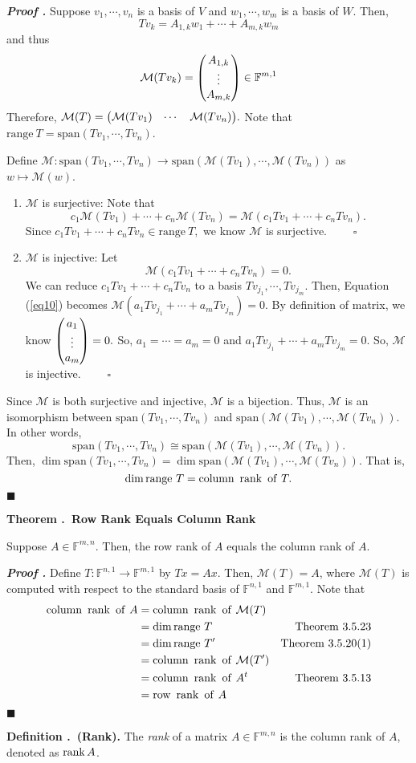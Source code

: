 \documentclass[11pt, letterpaper]{article}
\newcounter{index}[subsection]
\newenvironment*{df}[1]{\par\noindent\textbf{Definition \thesubsection.\stepcounter{index}\theindex\ (#1).}}{\par}
\newenvironment*{thm}[1]{\begin{tcolorbox}\par\noindent\textbf{Theorem \thesubsection.\stepcounter{index}\theindex\ #1} \par}{\par\end{tcolorbox}}
\newcounter{nprf}[subsection]
\newenvironment*{prf}{\par\indent\textbf{\textit{Proof \stepcounter{nprf}\thenprf.}}}{\hfill$\blacksquare$\par}
\def\F{\mathbb{F}}
\def\M{\mathcal{M}}
\def\span{\mathrm{span}}
\def\pqde{\qquad\square}
\def\range{\mathrm{range\ }}
\begin{document}
\begin{prf}
	Suppose $v_1,\cdots,v_n$ is a basis of $V$ and $w_1,\cdots,w_m$ is a basis of $W$. Then, \[Tv_k=A_{1,k}w_1+\cdots+A_{m,k}w_m\] and thus \[\M(Tv_k)=\mqty(A_{1,k}\\\vdots\\A_{m,k})\in\F^{m,1}\] Therefore, $\M(T)=\mqty(\M(Tv_1)&\cdots&\M(Tv_n)).$ Note that $\range T=\span(Tv_1,\cdots,Tv_n)$.\par
	 Define $\M:\span(Tv_1,\cdots,Tv_n)\to\span(\M(Tv_1),\cdots,\M(Tv_n))$ as $w\mapsto\M(w)$.
	 \begin{enumerate}
	 	\item $\M$ is surjective: Note that \[c_1\M(Tv_1)+\cdots+c_n\M(Tv_n)=\M(c_1Tv_1+\cdots+c_nTv_n).\] Since $c_1Tv_1+\cdots+c_nTv_n\in\range T,$ we know $\M$ is surjective. $\pqde$
	 	\item $\M$ is injective: Let \begin{equation}\label{eq10}\M(c_1Tv_1+\cdots+c_nTv_n)=0.\end{equation} We can reduce $c_1Tv_1+\cdots+c_nTv_n$ to a basis $Tv_{j_1},\cdots,Tv_{j_m}$. Then, Equation (\ref{eq10}) becomes $\M(a_1Tv_{j_1}+\cdots+a_mTv_{j_m})=0$. By definition of matrix, we know $\mqty(a_1\\\vdots\\a_m)=0.$ So, $a_1=\cdots=a_m=0$ and $a_1Tv_{j_1}+\cdots+a_mTv_{j_m}=0.$ So, $\M$ is injective. $\pqde$
	 \end{enumerate}
	 Since $\M$ is both surjective and injective, $\M$ is a bijection. Thus, $\M$ is an isomorphism between $\span(Tv_1,\cdots,Tv_n)$ and $\span(\M(Tv_1),\cdots,\M(Tv_n))$. In other words, \[\span(Tv_1,\cdots,Tv_n)\cong\span(\M(Tv_1),\cdots,\M(Tv_n)).\] Then, $\dim\span(Tv_1,\cdots,Tv_n)=\dim\span(\M(Tv_1),\cdots,\M(Tv_n))$. That is, \[\dim\range T=\mathrm{column\ }\rank\mathrm{\ of\ }T.\]
\end{prf}
\begin{thm}{Row Rank Equals Column Rank}
	Suppose $A\in\F^{m,n}$. Then, the row rank of $A$ equals the column rank of $A$. 
\end{thm}
\begin{prf}
	Define $T:\F^{n,1}\to\F^{m,1}$ by $Tx=Ax$.	Then, $\M(T)=A$, where $\M(T)$ is computed with respect to the standard basis of $\F^{n,1}$ and $\F^{m,1}$. Note that \[\begin{aligned}\mathrm{column\ }\rank\mathrm{\ of\ }A&=\mathrm{column\ }\rank\mathrm{\ of\ }\M(T)\\&=\dim\range T&\text{Theorem 3.5.23}\\&=\dim\range T'&\text{Theorem 3.5.20(1)}\\&=\mathrm{column\ }\rank\mathrm{\ of\ }\M(T')\\&=\mathrm{column\ }\rank\mathrm{\ of\ }A^t&\text{Theorem 3.5.13}\\&=\mathrm{row\ }\rank\mathrm{\ of\ }A\end{aligned}\]
\end{prf}
\begin{df}{Rank}
	The \textit{rank} of a matrix $A\in\F^{m,n}$ is the column rank of $A$, denoted as $\rank A$.
\end{df}
\end{document}
